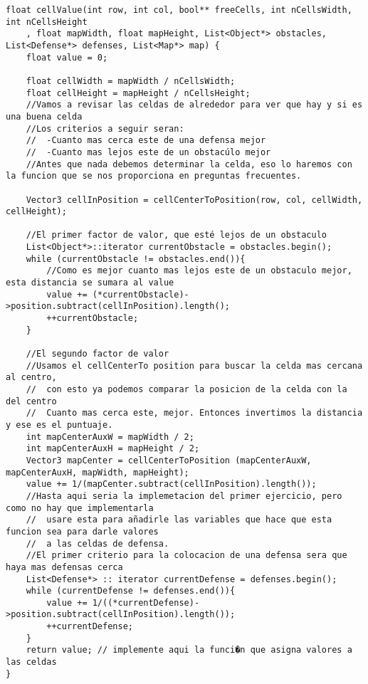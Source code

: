 \begin{lstlisting}
float cellValue(int row, int col, bool** freeCells, int nCellsWidth, int nCellsHeight
	, float mapWidth, float mapHeight, List<Object*> obstacles, List<Defense*> defenses, List<Map*> map) {
    float value = 0;

    float cellWidth = mapWidth / nCellsWidth;
    float cellHeight = mapHeight / nCellsHeight;
    //Vamos a revisar las celdas de alrededor para ver que hay y si es una buena celda
    //Los criterios a seguir seran:
    //  -Cuanto mas cerca este de una defensa mejor
    //  -Cuanto mas lejos este de un obstacúlo mejor
    //Antes que nada debemos determinar la celda, eso lo haremos con la funcion que se nos proporciona en preguntas frecuentes.
    
    Vector3 cellInPosition = cellCenterToPosition(row, col, cellWidth, cellHeight);    

    //El primer factor de valor, que esté lejos de un obstaculo
    List<Object*>::iterator currentObstacle = obstacles.begin();
    while (currentObstacle != obstacles.end()){
        //Como es mejor cuanto mas lejos este de un obstaculo mejor, esta distancia se sumara al value
        value += (*currentObstacle)->position.subtract(cellInPosition).length();
        ++currentObstacle; 
    }

    //El segundo factor de valor
    //Usamos el cellCenterTo position para buscar la celda mas cercana al centro,
    //  con esto ya podemos comparar la posicion de la celda con la del centro
    //  Cuanto mas cerca este, mejor. Entonces invertimos la distancia y ese es el puntuaje.
    int mapCenterAuxW = mapWidth / 2;
    int mapCenterAuxH = mapHeight / 2;
    Vector3 mapCenter = cellCenterToPosition (mapCenterAuxW, mapCenterAuxH, mapWidth, mapHeight);
    value += 1/(mapCenter.subtract(cellInPosition).length());
    //Hasta aqui seria la implemetacion del primer ejercicio, pero como no hay que implementarla
    //  usare esta para añadirle las variables que hace que esta funcion sea para darle valores 
    //  a las celdas de defensa.
    //El primer criterio para la colocacion de una defensa sera que haya mas defensas cerca
    List<Defense*> :: iterator currentDefense = defenses.begin();
    while (currentDefense != defenses.end()){
        value += 1/((*currentDefense)->position.subtract(cellInPosition).length());
        ++currentDefense;
    }
	return value; // implemente aqui la funci�n que asigna valores a las celdas
}
\end{lstlisting}